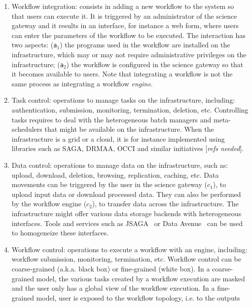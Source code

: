 \documentclass[preprint,3p,twocolumn]{elsarticle}
\newcommand{\todo}[1]{\color{blue}\xspace[\emph{#1}]\xspace\color{black}}
\begin{document}
\begin{enumerate}[leftmargin=0cm,itemindent=0.6cm,label=\texttt{(\alph*)}]

\item Workflow integration: consists in adding a new workflow to the
  system so that users can execute it. It is triggered by an
  administrator of the science gateway and it results in an interface,
  for instance a web form, where users can enter the parameters of the
  workflow to be executed. The interaction has two aspects:
  (\texttt{a$_1$}) the programs used in the workflow are installed on
  the infrastructure, which may or may not require administrative
  privileges on the infrastructure; (\texttt{a$_2$}) the workflow is
  configured in the science gateway so that it becomes available to
  users. Note that integrating a workflow is not the same process as
  integrating a workflow \emph{engine}.
\item Task control: operations to manage tasks on the infrastructure,
  including: authentication, submission, monitoring, termination,
  deletion, etc. Controlling tasks requires to deal with the
  heterogeneous batch managers and meta-schedulers that might be
  available on the infrastructure. When the infrastructure is a grid
  or a cloud, it is for instance implemented using libraries such as
  SAGA, DRMAA, OCCI and similar initiatives \todo{refs needed}.
\item Data control: operations to manage data on the infrastructure,
  such as: upload, download, deletion, browsing, replication, caching,
  etc. Data movements can be triggered by the user in the science
  gateway (\texttt{$c_1$}), to upload input data or download processed
  data. They can also be performed by the workflow engine
  (\texttt{$c_2$}), to transfer data across the infrastructure. The
  infrastructure might offer various data storage backends with
  heterogeneous interfaces. Tools and services such as
  JSAGA~\cite{reynaud2010uniform} or Data Avenue~\cite{hajnal2014data}
  can be used to homogeneize these interfaces.
\item Workflow control: operations to execute a workflow with an
  engine, including: workflow submission, monitoring, termination,
  etc. Workflow control can be coarse-grained (a.k.a. black box) or
  fine-grained (white box). In a coarse-grained model, the various
  tasks created by a workflow execution are masked and the user only
  has a global view of the workflow execution. In a fine-grained
  model, user is exposed to the workflow topology, i.e. to the outputs

\end{enumerate}
\end{document}
